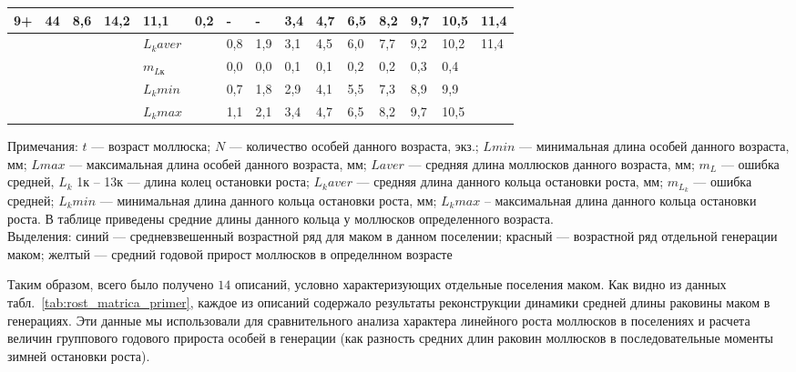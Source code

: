 \begin{table}[h]
\begin{tabularx}{\textwidth}{|X|X|XX|XX|XXXXXXXXX|}
        9+      & 44 & 8,6   & 14,2  & 11,1    & 0,2     & -   & -   & 3,4 & 4,7 & 6,5 & 8,2 & 9,7 & 10,5 & 11,4 \\ \hline
                &    &       &       & $L_{k} aver$  &  & \cellcolor{blue}0,8 & \cellcolor{blue}1,9 & \cellcolor{blue}3,1 & \cellcolor{blue}4,5 & \cellcolor{blue}6,0 & \cellcolor{blue}7,7 & \cellcolor{blue}9,2 & \cellcolor{blue}10,2 & \cellcolor{blue}11,4 \\
                &    &       &       & $m_{Lк}$      &  & 0,0 & 0,0 & 0,1 & 0,1 & 0,2 & 0,2 & 0,3 & 0,4  &      \\
                &    &       &       & $L_{k} min$  &   & 0,7 & 1,8 & 2,9 & 4,1 & 5,5 & 7,3 & 8,9 & 9,9  &      \\
                &    &       &       &  $L_{k} max$ &   & 1,1 & 2,1 & 3,4 & 4,7 & 6,5 & 8,2 & 9,7 & 10,5 &     \\ \hline
    \end{tabularx}
    \footnotesize{Примечания: $t$ --- возраст моллюска; 
        $N$ --- количество  особей  данного возраста, экз.; 
        $L min$  ---  минимальная   длина  особей   данного   возраста,   мм;   
        $L max$   ---   максимальная   длина   особей   данного   возраста,   мм; 
        $L aver$ --- средняя длина моллюсков данного возраста, мм; 
        $m_L$ --- ошибка средней, 
        $L_k$ 1к -- 13к --- длина колец остановки роста;
        $L_k aver$ --- средняя длина данного кольца остановки роста, мм; 
        $m_{L_k}$ --- ошибка средней; 
        $L_k min$ --- минимальная длина данного кольца остановки роста, мм; 
        $L_k   max$   --   максимальная   длина   данного   кольца   остановки   роста.   
        В   таблице   приведены средние длины данного кольца у моллюсков определенного возраста. \\[1em]
    Выделения: синий --- средневзвешенный возрастной ряд для маком в данном поселении;
        красный --- возрастной ряд отдельной генерации маком;
        желтый --- средний годовой прирост моллюсков в определнном возрасте}
\end{table}
Таким образом, всего было получено $14$ описаний, условно характеризующих отдельные поселения маком. 
Как видно из данных табл.~\ref{tab:rost_matrica_primer}, каждое из описаний содержало результаты реконструкции динамики средней длины раковины маком в генерациях. 
Эти данные мы использовали для сравнительного анализа характера линейного роста моллюсков в поселениях и расчета величин группового годового прироста особей в генерации (как разность средних длин раковин моллюсков в последовательные моменты зимней остановки роста).

